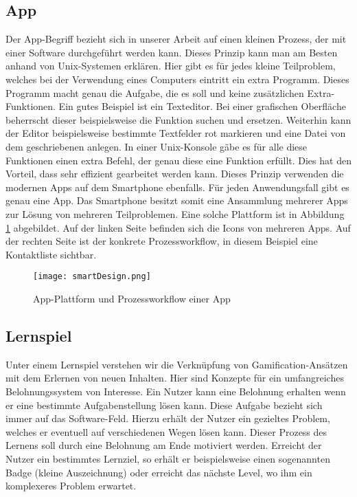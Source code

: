 \subsection{App}
Der App-Begriff bezieht sich in unserer Arbeit auf einen kleinen Prozess, der mit einer Software durchgeführt werden kann. Dieses Prinzip kann man am Besten anhand von Unix-Systemen erklären. Hier gibt es für jedes kleine Teilproblem, welches bei der Verwendung eines Computers eintritt ein extra Programm. Dieses Programm macht genau die Aufgabe, die es soll und keine zusätzlichen Extra-Funktionen. Ein gutes Beispiel ist ein Texteditor. Bei einer grafischen Oberfläche beherrscht dieser beispielsweise die Funktion suchen und ersetzen. Weiterhin kann der Editor beispielsweise bestimmte Textfelder rot markieren und eine Datei von dem geschriebenen anlegen. In einer Unix-Konsole gäbe es für alle diese Funktionen einen extra Befehl, der genau diese eine Funktion erfüllt. Dies hat den Vorteil, dass sehr effizient gearbeitet werden kann. Dieses Prinzip verwenden die modernen Apps auf dem Smartphone ebenfalls. Für jeden Anwendungsfall gibt es genau eine App. Das Smartphone besitzt somit eine Ansammlung mehrerer Apps zur Lösung von mehreren Teilproblemen. Eine solche Plattform ist in Abbildung \ref{img1:smartDesign} abgebildet. Auf der linken Seite befinden sich die Icons von mehreren Apps. Auf der rechten Seite ist der konkrete Prozessworkflow, in diesem Beispiel eine Kontaktliste sichtbar. 

\begin{figure}[ht]
\begin{center}
\texttt{[image: smartDesign.png]}
\caption{App-Plattform und Prozessworkflow einer App}
\label{img1:smartDesign}
\end{center}
\end{figure} 

\subsection{Lernspiel}
Unter einem Lernspiel verstehen wir die Verknüpfung von Gamification-Ansätzen mit dem Erlernen von neuen Inhalten. Hier sind Konzepte für ein umfangreiches Belohnungssystem von Interesse. Ein Nutzer kann eine Belohnung erhalten wenn er eine bestimmte Aufgabenstellung lösen kann. Diese Aufgabe bezieht sich immer auf das Software-Feld. Hierzu erhält der Nutzer ein gezieltes Problem, welches er eventuell auf verschiedenen Wegen lösen kann. Dieser Prozess des Lernens soll durch eine Belohnung am Ende motiviert werden. Erreicht der Nutzer ein bestimmtes Lernziel, so erhält er beispielsweise einen sogenannten Badge (kleine Auszeichnung) oder erreicht das nächste Level, wo ihm ein komplexeres Problem erwartet. 

